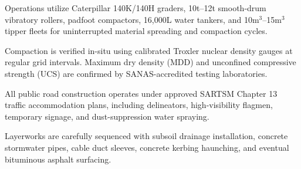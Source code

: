 \documentclass[a4paper,11pt]{article}
\providecommand{\faTrafficLight}{\faBolt}
\begin{document}
\noindent
\begin{minipage}[t]{0.485\textwidth}
    \begin{tcolorbox}[enhanced, colback=white, colframe=mhlightgray, boxrule=0.8pt, arc=4pt, title={\bfseries\color{white}\faTruckMonster\ Dedicated Plant Spreads}, colbacktitle=mhnavy, left=8pt, right=8pt, top=7pt, bottom=7pt, drop shadow=black!4]
        {\fontsize{8.1pt}{11.3pt}\selectfont\color{mhtext}
        Operations utilize Caterpillar 140K/140H graders, 10t--12t smooth-drum vibratory rollers, padfoot compactors, 16,000L water tankers, and 10m$^3$--15m$^3$ tipper fleets for uninterrupted material spreading and compaction cycles.
        }
    \end{tcolorbox}
\end{minipage}
\hfill
\begin{minipage}[t]{0.485\textwidth}
    \begin{tcolorbox}[enhanced, colback=white, colframe=mhlightgray, boxrule=0.8pt, arc=4pt, title={\bfseries\color{white}\faClipboardCheck\ Troxler Density Testing}, colbacktitle=mhblue, left=8pt, right=8pt, top=7pt, bottom=7pt, drop shadow=black!4]
        {\fontsize{8.1pt}{11.3pt}\selectfont\color{mhtext}
        Compaction is verified in-situ using calibrated Troxler nuclear density gauges at regular grid intervals. Maximum dry density (MDD) and unconfined compressive strength (UCS) are confirmed by SANAS-accredited testing laboratories.
        }
    \end{tcolorbox}
\end{minipage}

\vspace{0.18cm}

\noindent
\begin{minipage}[t]{0.485\textwidth}
    \begin{tcolorbox}[enhanced, colback=white, colframe=mhlightgray, boxrule=0.8pt, arc=4pt, title={\bfseries\color{white}\faTrafficLight\ Traffic Accommodation \& Safety}, colbacktitle=mhnavy, left=8pt, right=8pt, top=7pt, bottom=7pt, drop shadow=black!4]
        {\fontsize{8.1pt}{11.3pt}\selectfont\color{mhtext}
        All public road construction operates under approved SARTSM Chapter 13 traffic accommodation plans, including delineators, high-visibility flagmen, temporary signage, and dust-suppression water spraying.
        }
    \end{tcolorbox}
\end{minipage}
\hfill
\begin{minipage}[t]{0.485\textwidth}
    \begin{tcolorbox}[enhanced, colback=white, colframe=mhlightgray, boxrule=0.8pt, arc=4pt, title={\bfseries\color{white}\faLink\ Multi-Trade Civil Alignment}, colbacktitle=mhblue, left=8pt, right=8pt, top=7pt, bottom=7pt, drop shadow=black!4]
        {\fontsize{8.1pt}{11.3pt}\selectfont\color{mhtext}
        Layerworks are carefully sequenced with subsoil drainage installation, concrete stormwater pipes, cable duct sleeves, concrete kerbing haunching, and eventual bituminous asphalt surfacing.
        }
    \end{tcolorbox}
\end{minipage}
\end{document}
